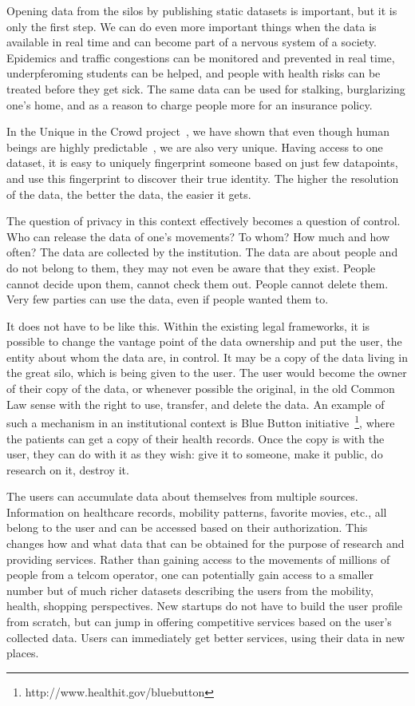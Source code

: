 Opening data from the silos by publishing static datasets is important, but it is only the first step. 
We can do even more important things when the data is available in real time and can become part of a nervous system of a society.
Epidemics and traffic congestions can be monitored and prevented in real time, underpferoming students can be helped, and people with health risks can be treated before they get sick.
The same data can be used for stalking, burglarizing one's home, and as a reason to charge people more for an insurance policy.

In the Unique in the Crowd project~\cite{de2013unique}, we have shown that even though human beings are highly predictable~\cite{song2010limits}, we are also very unique.
Having access to one dataset, it is easy to uniquely fingerprint someone based on just few datapoints, and use this fingerprint to discover their true identity. 
The higher the resolution of the data, the better the data, the easier it gets.

The question of privacy in this context effectively becomes a question of control. 
Who can release the data of one's movements?
To whom? 
How much and how often?
The data are collected by the institution.
The data are about people and do not belong to them, they may not even be aware that they exist.
People cannot decide upon them, cannot check them out.
People cannot delete them.
Very few parties can use the data, even if people wanted them to.

It does not have to be like this.
Within the existing legal frameworks, it is possible to change the vantage point of the data ownership and put the user, the entity about whom the data are, in control.
It may be a copy of the data living in the great silo, which is being given to the user.
The user would become the owner of their copy of the data, or whenever possible the original, in the old Common Law sense with the right to use, transfer, and delete the data. 
An example of such a mechanism in an institutional context is Blue Button initiative~\footnote{http://www.healthit.gov/bluebutton}, where the patients can get a copy of their health records.
Once the copy is with the user, they can do with it as they wish: give it to someone, make it public, do research on it, destroy it.

The users can accumulate data about themselves from multiple sources. 
Information on healthcare records, mobility patterns, favorite movies, etc., all belong to the user and can be accessed based on their authorization.
This changes how and what data that can be obtained for the purpose of research and providing services.
Rather than gaining access to the movements of millions of people from a telcom operator, one can potentially gain access to a smaller number but of much richer datasets describing the users from the mobility, health, shopping  perspectives.
New startups do not have to build the user profile from scratch, but can jump in offering competitive services based on the user's collected data.
Users can immediately get better services, using their data in new places.

